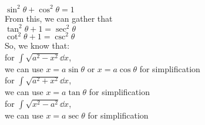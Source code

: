 $\sin^2\theta + \cos^2\theta = 1$\\
From this, we can gather that\\
$\tan^2\theta + 1 = \sec^2\theta$\\
$\cot^2\theta + 1 = \csc^2\theta$\\
So, we know that:\\
for $\int\sqrt{a^2 - x^2} \dd x$,\\
we can use $x =  a\sin \theta$ or $x =  a\cos \theta$ for simplification\\
for $\int\sqrt{a^2 + x^2} \dd x$,\\
we can use $x =  a\tan \theta$ for simplification\\
for $\int\sqrt{x^2 - a^2} \dd x$,\\
we can use $x = a \sec \theta$ for simplification \\
